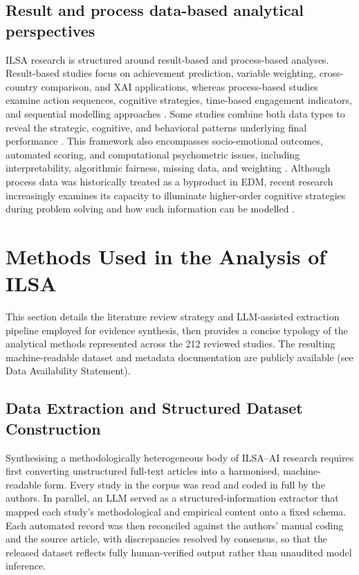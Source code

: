 \documentclass{ieeeaccess}
\begin{document}
\subsection{Result and process data-based analytical perspectives} \label{subsec2.4}

ILSA research is structured around result-based and process-based analyses. Result-based studies focus on achievement prediction, variable weighting, cross-country comparison, and XAI applications, whereas process-based studies examine action sequences, cognitive strategies, time-based engagement indicators, and sequential modelling approaches \cite{gomez-talal-etal2025, tang-etal2021}. Some studies combine both data types to reveal the strategic, cognitive, and behavioral patterns underlying final performance \cite{chen-etal2023}. This framework also encompasses socio-emotional outcomes, automated scoring, and computational psychometric issues, including interpretability, algorithmic fairness, missing data, and weighting \cite{andersen-etal2025, zhai-etal2024}. Although process data was historically treated as a byproduct in EDM, recent research increasingly examines its capacity to illuminate higher-order cognitive strategies during problem solving and how such information can be modelled \cite{gong-etal2023}.

\section{Methods Used in the Analysis of ILSA}\label{sec3}

This section details the literature review strategy and LLM-assisted extraction pipeline employed for evidence synthesis, then provides a concise typology of the analytical methods represented across the 212 reviewed studies. The resulting machine-readable dataset and metadata documentation are publicly available (see Data Availability Statement).

\subsection{Data Extraction and Structured Dataset Construction}
\label{subsec:extraction}

Synthesising a methodologically heterogeneous body of ILSA--AI research requires first converting unstructured full-text articles into a harmonised, machine-readable form. Every study in the corpus was read and coded in full by the authors. In parallel, an LLM served as a structured-information extractor that mapped each study's methodological and empirical content onto a fixed schema. Each automated record was then reconciled against the authors' manual coding and the source article, with discrepancies resolved by consensus, so that the released dataset reflects fully human-verified output rather than unaudited model inference.
\end{document}
